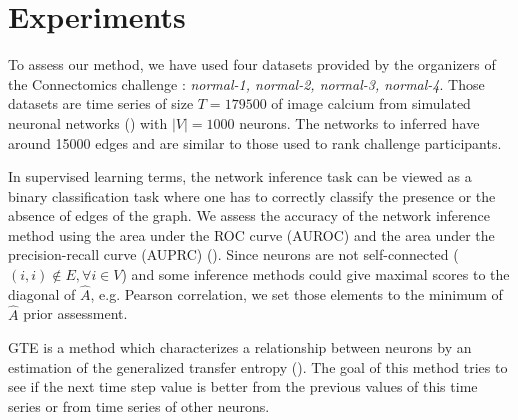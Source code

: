 \documentclass[wcp]{jmlr}
\begin{document}
\section{Experiments}
\label{sec:results}

To assess our method, we have used four datasets provided by the organizers
of the Connectomics challenge : \textit{normal-1, normal-2, normal-3, normal-4}.
Those datasets are time series of size $T=179500$ of image calcium from simulated
neuronal networks (\cite{stetter2012model}) with $|V|=1000$ neurons. The networks
to inferred have around 15000 edges and are similar to those
used to rank challenge participants.

In supervised learning terms, the network inference task can be viewed as a
binary classification task where one has to correctly classify the presence
or the absence of edges of the graph. We assess the accuracy of the
network inference method using the area under the ROC curve (AUROC)
and the area under the precision-recall curve (AUPRC)
(\cite{schrynemackers2013protocols}). Since neurons are not self-connected
($(i, i) \not \in E, \forall i \in V$) and some inference methods could
give maximal scores to the diagonal of $\hat{A}$, e.g. Pearson
correlation, we set those elements to the minimum of $\hat{A}$ prior
assessment.













GTE is a method which characterizes a relationship between neurons by an
estimation of the generalized transfer entropy (\cite{stetter2012model}). The
goal of this method tries to see if the next time step value is better from
the previous values of this time series or from time series of other neurons.
\end{document}
